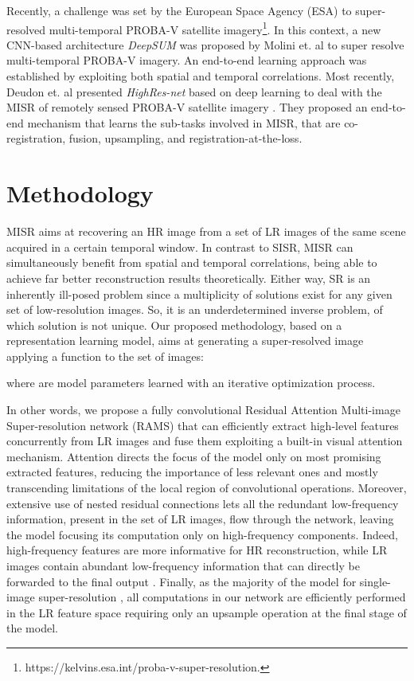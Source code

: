 \documentclass[journal]{IEEEtran}
\begin{document}
Recently, a challenge was set by the European Space Agency (ESA) to super-resolved multi-temporal PROBA-V satellite imagery\footnote{https://kelvins.esa.int/proba-v-super-resolution.}. In this context, a new CNN-based architecture \textit{DeepSUM} was proposed by Molini et. al \cite{molini2019deepsum} to super resolve multi-temporal PROBA-V imagery. An end-to-end learning approach was established by exploiting both spatial and temporal correlations.
Most recently, Deudon et. al presented \textit{HighRes-net} based on deep learning to deal with the MISR of remotely sensed PROBA-V satellite imagery \cite{deudon2020highres}. They proposed an end-to-end mechanism that learns the sub-tasks involved in MISR, that are co-registration, fusion, upsampling, and registration-at-the-loss.


\section{Methodology} \label{methodology}
MISR aims at recovering an HR image  from a set of  LR images  of the same scene acquired in a certain temporal window. In contrast to SISR, MISR can simultaneously benefit from spatial and temporal correlations, being able to achieve far better reconstruction results theoretically. Either way, SR is an inherently ill-posed problem since a multiplicity of solutions exist for any given set of low-resolution images. So, it is an underdetermined inverse problem, of which solution is not unique. Our proposed methodology, based on a representation learning model, aims at generating a super-resolved image  applying a function  to the set of  images:

where  are model parameters learned with an iterative optimization process.

In other words, we propose a fully convolutional Residual Attention Multi-image Super-resolution network (RAMS) that can efficiently extract high-level features concurrently from  LR images and fuse them exploiting a built-in visual attention mechanism. Attention directs the focus of the model only on most promising extracted features, reducing the importance of less relevant ones and mostly transcending limitations of the local region of convolutional operations. Moreover, extensive use of nested residual connections lets all the redundant low-frequency information, present in the set  of LR images, flow through the network, leaving the model focusing its computation only on high-frequency components. Indeed, high-frequency features are more informative for HR reconstruction, while LR images contain abundant low-frequency information that can directly be forwarded to the final output \cite{zhang2018image}. Finally, as the majority of the model for single-image super-resolution \cite{lim2017enhanced, yu2018wide, dong2016accelerating, dai2019second}, all computations in our network are efficiently performed in the LR feature space requiring only an upsample operation at the final stage of the model. 
\end{document}
